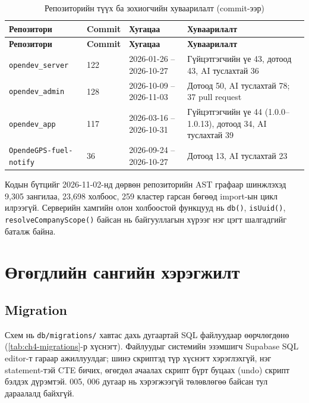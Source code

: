 \documentclass[
12pt,
oneside,
english,
onehalfspacing,
nolistspacing,
headsepline,
]{MUST-Thesis}
\begin{document}
{\small
\renewcommand{\arraystretch}{1.2}
\begin{longtable}{|L{3.4cm}|L{1.6cm}|L{3.4cm}|L{5.4cm}|}
\caption{Репозиторийн түүх ба зохиогчийн хуваарилалт (commit-ээр)}\label{tab:ch4-history}\\
\hline
{}\textbf{Репозитори} & \textbf{Commit} & \textbf{Хугацаа} & \textbf{Хуваарилалт} \\ \hline
\endfirsthead
\hline
{}\textbf{Репозитори} & \textbf{Commit} & \textbf{Хугацаа} & \textbf{Хуваарилалт} \\ \hline
\endhead
\texttt{opendev\_server} & 122 & 2026-01-26 -- 2026-10-27 & Гүйцэтгэгчийн үе 43, дотоод 43, AI туслахтай 36 \\ \hline
\texttt{opendev\_admin} & 128 & 2026-10-09 -- 2026-11-03 & Дотоод 50, AI туслахтай 78; 37 pull request \\ \hline
\texttt{opendev\_app} & 117 & 2026-03-16 -- 2026-10-31 & Гүйцэтгэгчийн үе 44 (1.0.0--1.0.13), дотоод 34, AI туслахтай 39 \\ \hline
\texttt{OpendeGPS-fuel-notify} & 36 & 2026-09-24 -- 2026-10-27 & Дотоод 13, AI туслахтай 23 \\ \hline
\end{longtable}
}

Кодын бүтцийг 2026-11-02-нд дөрвөн репозиторийн AST графаар шинжлэхэд 9,305 зангилаа, 23,698 холбоос, 259 кластер гарсан бөгөөд import-ын цикл илрээгүй. Серверийн хамгийн олон холбоостой функцууд нь \texttt{db()}, \texttt{isUuid()}, \texttt{resolveCompanyScope()} байсан нь байгууллагын хүрээг нэг цэгт шалгадгийг баталж байна.

\section{Өгөгдлийн сангийн хэрэгжилт}

\subsection{Migration}

Схем нь \texttt{db/migrations/} хавтас дахь дугаартай SQL файлуудаар өөрчлөгдөнө (\ref{tab:ch4-migrations}-р хүснэгт). Файлуудыг системийн эзэмшигч Supabase SQL editor-т гараар ажиллуулдаг; шинэ скриптэд түр хүснэгт хэрэглэхгүй, нэг statement-тэй CTE бичих, өгөгдөл ачаалах скрипт бүрт буцаах (undo) скрипт бэлдэх дүрэмтэй. 005, 006 дугаар нь хэрэгжээгүй төлөвлөгөө байсан тул дараалалд байхгүй.
\end{document}
